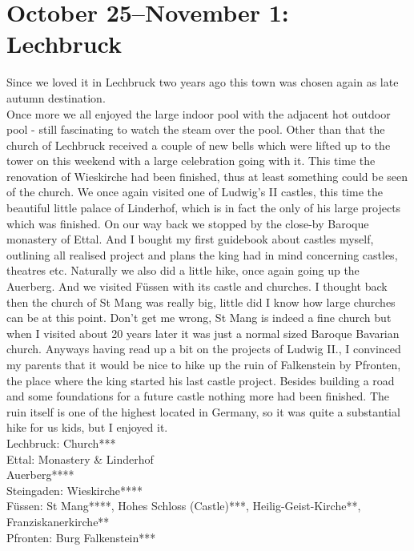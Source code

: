 \section{October 25--November 1: Lechbruck}
\label{1992:Lechbruck}

Since we loved it in Lechbruck two years ago this town was chosen again as late autumn destination.\\

Once more we all enjoyed the large indoor pool with the adjacent hot outdoor pool - still fascinating to watch the steam over the pool. Other than that the church of Lechbruck received a couple of new bells which were lifted up to the tower on this weekend with a large celebration going with it. This time the renovation of Wieskirche had been finished, thus at least something could be seen of the church. We once again visited one of Ludwig's II castles, this time the beautiful little palace of Linderhof, which is in fact the only of his large projects which was finished. On our way back we stopped by the close-by Baroque monastery of Ettal. And I bought my first guidebook about castles myself, outlining all realised project and plans the king had in mind concerning castles, theatres etc. Naturally we also did a little hike, once again going up the Auerberg. And we visited F\"ussen with its castle and churches. I thought back then the church of St Mang was really big, little did I know how large churches can be at this point. Don't get me wrong, St Mang is indeed a fine church but when I visited about 20 years later it was just a normal sized Baroque Bavarian church. Anyways having read up a bit on the projects of Ludwig II., I convinced my parents that it would be nice to hike up the ruin of Falkenstein by Pfronten, the place where the king started his last castle project. Besides building a road and some foundations for a future castle nothing more had been finished. The ruin itself is one of the highest located in Germany, so it was quite a substantial hike for us kids, but I enjoyed it.\\

Lechbruck: Church***\\
Ettal: Monastery \& Linderhof\\
Auerberg****\\
Steingaden: Wieskirche****\\
F\"ussen: St Mang****, Hohes Schloss (Castle)***, Heilig-Geist-Kirche**, Franziskanerkirche**\\
Pfronten: Burg Falkenstein***\\


